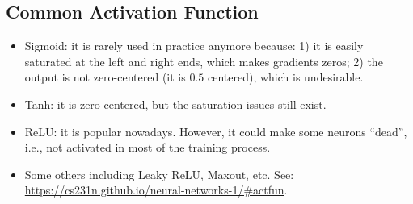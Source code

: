 \subsection{Common Activation Function}
    \begin{itemize}
        \item Sigmoid: it is rarely used in practice anymore because: 1) it is easily saturated at the left and right ends, which makes gradients zeros; 2) the output is not zero-centered (it is $0.5$ centered), which is undesirable.
        \item Tanh: it is zero-centered, but the saturation issues still exist.
        \item ReLU: it is popular nowadays. However, it could make some neurons ``dead'', i.e., not activated in most of the training process.
        \item Some others including Leaky ReLU, Maxout, etc. See: \url{https://cs231n.github.io/neural-networks-1/#actfun}.
    \end{itemize}



